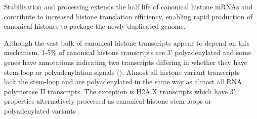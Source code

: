 	Stabilisation and processing extends the half life of canonical histone mRNAs 
	and contribute to increased histone translation efficiency, 
	enabling rapid production of canonical histones to package the newly duplicated genome.

	Although the vast bulk of canonical histone transcripts appear to depend on this mechanism, 
	1-5\% of canonical histone transcripts are 3' polyadenylated \citep{YangGenomeBiol2011} 
	and some genes have annotations indicating two transcripts 
	differing in whether they have stem-loop or polyadenylation signals (). 
	Almost all histone variant transcripts lack the stem-loop and are polyadenylated 
	in the same way as almost all RNA polymerase II transcripts.
	The exception is H2A.X transcripts which have 3' properties alternatively
	processed as canonical histone stem-loops 
	or polyadenylated variants \citep{HTwoAX-transcripts,our-H2AX-review}.